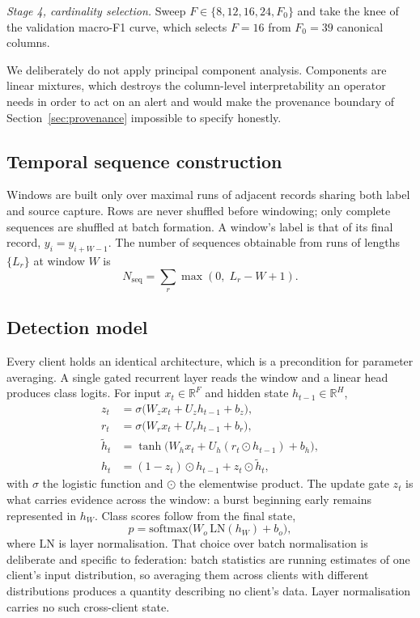 \documentclass[conference]{IEEEtran}
\begin{document}
\emph{Stage 4, cardinality selection.} Sweep $F \in \{8, 12, 16, 24, F_0\}$ and take the knee of
the validation macro-F1 curve, which selects $F = 16$ from $F_0 = 39$ canonical columns.

We deliberately do not apply principal component analysis. Components are linear mixtures, which
destroys the column-level interpretability an operator needs in order to act on an alert and would
make the provenance boundary of Section~\ref{sec:provenance} impossible to specify honestly.

\subsection{Temporal sequence construction}\label{sec:sequences}
Windows are built only over maximal runs of adjacent records sharing both label and source
capture. Rows are never shuffled before windowing; only complete sequences are shuffled at batch
formation. A window's label is that of its final record, $y_i = y_{i+W-1}$. The number of
sequences obtainable from runs of lengths $\{L_r\}$ at window $W$ is
\begin{equation}
N_{\text{seq}} = \sum_r \max(0,\; L_r - W + 1).
\label{eq:nseq}
\end{equation}

\subsection{Detection model}
Every client holds an identical architecture, which is a precondition for parameter
averaging. A single gated recurrent layer reads the window and a linear head produces class
logits. For input $x_t \in \mathbb{R}^{F}$ and hidden state $h_{t-1} \in \mathbb{R}^{H}$,
\begin{align}
z_t &= \sigma\big(W_z x_t + U_z h_{t-1} + b_z\big), \label{eq:gru_z}\\
r_t &= \sigma\big(W_r x_t + U_r h_{t-1} + b_r\big), \label{eq:gru_r}\\
\tilde{h}_t &= \tanh\big(W_h x_t + U_h (r_t \odot h_{t-1}) + b_h\big), \label{eq:gru_ht}\\
h_t &= (1 - z_t) \odot h_{t-1} + z_t \odot \tilde{h}_t, \label{eq:gru_h}
\end{align}
with $\sigma$ the logistic function and $\odot$ the elementwise product. The update gate $z_t$ is
what carries evidence across the window: a burst beginning early remains represented in $h_W$.
Class scores follow from the final state,
\begin{equation}
p = \mathrm{softmax}\big(W_o\, \mathrm{LN}(h_W) + b_o\big),
\label{eq:head}
\end{equation}
where $\mathrm{LN}$ is layer normalisation. That choice over batch normalisation is deliberate and
specific to federation: batch statistics are running estimates of one client's input distribution,
so averaging them across clients with different distributions produces a quantity describing no
client's data. Layer normalisation carries no such cross-client state.
\end{document}

